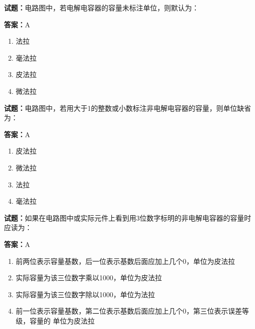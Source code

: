 \documentclass{ctexbook}
\begin{document}




\vspace{1em}

\textbf{试题：}电路图中，若电解电容器的容量未标注单位，则默认为： 

\textbf{答案：}A 

\begin{enumerate}[leftmargin=3em]
  \item 法拉 

  \item 毫法拉 

  \item 皮法拉 

  \item 微法拉 

\end{enumerate}





\vspace{1em}

\textbf{试题：}电路图中，若用大于1的整数或小数标注非电解电容器的容量，则单位缺省为： 

\textbf{答案：}A 

\begin{enumerate}[leftmargin=3em]
  \item 皮法拉 

  \item 微法拉 

  \item 法拉 

  \item 毫法拉 

\end{enumerate}





\vspace{1em}

\textbf{试题：}如果在电路图中或实际元件上看到用3位数字标明的非电解电容器的容量时应读为： 

\textbf{答案：}A 

\begin{enumerate}[leftmargin=3em]
  \item 前两位表示容量基数，后一位表示基数后面应加上几个0，单位为皮法拉 

  \item 实际容量为该三位数字乘以1000，单位为皮法拉 

  \item 实际容量为该三位数字除以1000，单位为法拉 

  \item 前一位表示容量基数，第二位表示基数后面应加上几个0，第三位表示误差等级，容量的
单位为皮法拉 

\end{enumerate}
\end{document}
